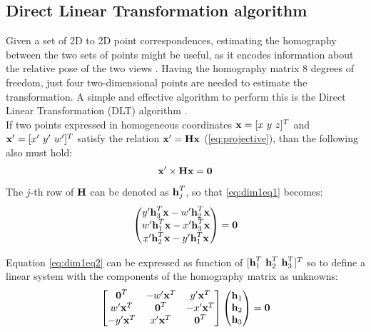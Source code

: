 \subsection{Direct Linear Transformation algorithm}
\label{toc:DLT}
Given a set of 2D to 2D point correspondences, estimating the homography between the two sets of points might be useful, as it encodes information about the relative pose of the two views \cite{hartley2003multiple}. Having the homography matrix 8 degrees of freedom, just four two-dimensional points are needed to estimate the transformation. A simple and effective algorithm to perform this is the Direct Linear Transformation (DLT) algorithm \cite{hartley2003multiple}. \\
If two points expressed in homogeneous coordinates $\mathrm{\textbf{x}}=[x \ y \ z]^T$ and $\mathrm{\textbf{x}}'=[x'\ y'\ w']^T$ satisfy the relation $\mathrm{\textbf{x}}'= \mathrm{\textbf{H}}\mathrm{\textbf{x}}$ (\cref{eq:projective}), than the following also must hold:
\begin{equation}
\label{eq:dim1eq1}
    \mathrm{\textbf{x}}' \times \mathrm{\textbf{H}}\mathrm{\textbf{x}} = \mathrm{\textbf{0}}
\end{equation}
The $j$-th row of $\mathrm{\textbf{H}}$ can be denoted as $\mathrm{\textbf{h}}^{T}_j$, so that \cref{eq:dim1eq1} becomes:
\begin{equation}
\label{eq:dim1eq2}
    \begin{pmatrix}
        y'\mathrm{\textbf{h}}^{T}_3\mathrm{\textbf{x}} - w'\mathrm{\textbf{h}}^{T}_2\mathrm{\textbf{x}}\\
        w'\mathrm{\textbf{h}}^{T}_1\mathrm{\textbf{x}} - x'\mathrm{\textbf{h}}^{T}_3\mathrm{\textbf{x}}\\
        x'\mathrm{\textbf{h}}^{T}_2\mathrm{\textbf{x}} - y'\mathrm{\textbf{h}}^{T}_1\mathrm{\textbf{x}}\\
        \end{pmatrix} = \mathrm{\textbf{0}}
\end{equation}

Equation \cref{eq:dim1eq2} can be expressed as function of $[\mathrm{\textbf{h}}^{T}_1 \ \mathrm{\textbf{h}}^{T}_2 \ \mathrm{\textbf{h}}^{T}_3]^T$ so to define a linear system with the components of the homography matrix as unknowns:
\begin{equation}
    \begin{bmatrix}
        \mathrm{\textbf{0}}^T & -w'\mathrm{\textbf{x}}^T  & y'\mathrm{\textbf{x}}^T\\
        w'\mathrm{\textbf{x}}^T & \mathrm{\textbf{0}}^T  & -x'\mathrm{\textbf{x}}^T\\
        -y'\mathrm{\textbf{x}}^T & x'\mathrm{\textbf{x}}^T &  \mathrm{\textbf{0}}^T\\
    \end{bmatrix}\begin{pmatrix}
        \mathrm{\textbf{h}}_1 \\ \mathrm{\textbf{h}}_2 \\ \mathrm{\textbf{h}}_3
    \end{pmatrix} =  \mathrm{\textbf{0}}
\end{equation}

